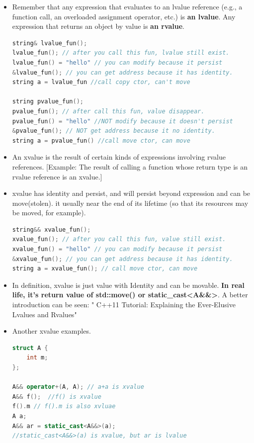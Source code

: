 \documentclass[a4paper,12pt,twoside]{book}
\begin{document}
\begin{itemize}

\item Remember that any expression that evaluates to an lvalue reference (e.g., a function call, an overloaded assignment operator, etc.) is \textbf{an lvalue}. Any expression that returns an object by value is \textbf{an rvalue}.

\begin{lstlisting}[frame=single, language=c++, mathescape=true]
string& lvalue_fun();
lvalue_fun(); // after you call this fun, lvalue still exist.
lvalue_fun() = "hello" // you can modify because it persist
&lvalue_fun(); // you can get address because it has identity.
string a = lvalue_fun //call copy ctor, can't move

string pvalue_fun();
pvalue_fun(); // after call this fun, value disappear.
pvalue_fun() = "hello" //NOT modify because it doesn't persist
&pvalue_fun(); // NOT get address because it no identity.
string a = pvalue_fun() //call move ctor, can move
\end{lstlisting}

\item An xvalue is the result of certain kinds of expressions involving rvalue references. [Example: The result of calling a function whose return type is an rvalue reference is an xvalue.]

\item xvalue has identity and persist, and will persist beyond expression and can be move(stolen). it usually near the end of its lifetime (so that its resources may be moved, for example).
\begin{lstlisting}[frame=single, language=c++, mathescape=true]
string&& xvalue_fun();
xvalue_fun(); // after you call this fun, value still exist.
xvalue_fun() = "hello" // you can modify because it persist
&xvalue_fun(); // you can get address because it has identity.
string a = xvalue_fun(); // call move ctor, can move
\end{lstlisting}

\item In definition,  xvalue is just value with Identity and can be movable. \textbf{In real life, it's  return value of std::move() or static\_cast<A\&\&>}. A better introduction can be seen: " C++11 Tutorial: Explaining the Ever-Elusive Lvalues and Rvalues"

\item Another xvalue examples.
\begin{lstlisting}[frame=single, language=c++]
struct A {
    int m;
};

A&& operator+(A, A); // a+a is xvalue
A&& f();  //f() is xvalue
f().m // f().m is also xvluae
A a;
A&& ar = static_cast<A&&>(a);
//static_cast<A&&>(a) is xvalue, but ar is lvalue
\end{lstlisting}


\end{itemize}
\end{document}

